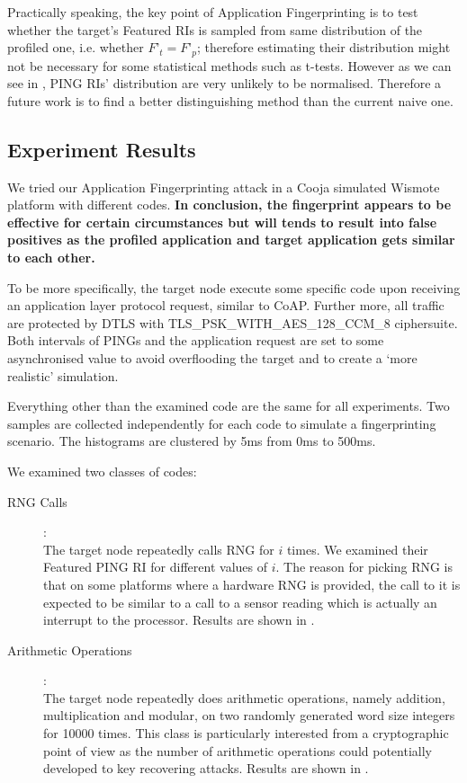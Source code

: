 Practically speaking, the key point of Application Fingerprinting is to test whether the target’s Featured RIs is sampled from same distribution of the profiled one, i.e. whether $F’_t = F’_p$; therefore estimating their distribution might not be necessary for some statistical methods such as t-tests. However as we can see in , PING RIs’ distribution are very unlikely to be normalised. Therefore a future work is to find a better distinguishing method than the current naive one.

\subsection{Experiment Results}
We tried our Application Fingerprinting attack in a Cooja simulated Wismote platform with different codes. \textbf{In conclusion, the fingerprint appears to be effective for certain circumstances but will tends to result into false positives as the profiled application and target application gets similar to each other.}

To be more specifically, the target node execute some specific code upon receiving an application layer protocol request, similar to CoAP. Further more, all traffic are protected by DTLS with TLS\_PSK\_WITH\_AES\_128\_CCM\_8 ciphersuite. Both intervals of PINGs and the application request are set to some asynchronised value to avoid overflooding the target and to create a ‘more realistic’ simulation.

Everything other than the examined code are the same for all experiments. Two samples are collected independently for each code to simulate a fingerprinting scenario. The histograms are clustered by 5ms from 0ms to 500ms.

We examined two classes of codes:
\begin{description}
\item[RNG Calls]: \hfill\\
The target node repeatedly calls RNG for $i$ times. We examined their Featured PING RI for different values of $i$. The reason for picking RNG is that on some platforms where a hardware RNG is provided, the call to it is expected to be similar to a call to a sensor reading which is actually an interrupt to the processor. Results are shown in .

\item[Arithmetic Operations]: \hfill\\
The target node repeatedly does arithmetic operations, namely addition, multiplication and modular, on two randomly generated word size integers for 10000 times. This class is particularly interested from a cryptographic point of view as the number of arithmetic operations could potentially developed to key recovering attacks. Results are shown in .
\end{description}



